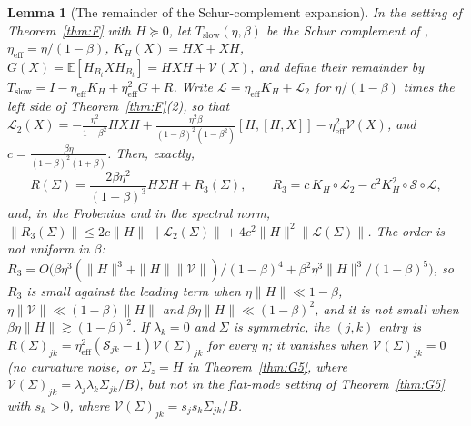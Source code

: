 \documentclass[11pt]{article}
\newtheorem{lemma}[theorem]{Lemma}
\theoremstyle{remark}
\newcommand{\E}{\mathbb{E}}
\begin{document}
\begin{lemma}[The remainder of the Schur-complement expansion]\label{lem:remainder}
In the setting of Theorem~\ref{thm:F} with $H\succeq0$, let $T_{\mathrm{slow}}(\eta,\beta)$ be the Schur complement of \citet[Appendix~D]{andreyev2026momentum}, $\eta_{\mathrm{eff}}=\eta/(1-\beta)$, $K_H(X)=HX+XH$, $G(X)=\E[H_{B_t}XH_{B_t}]=HXH+\mathcal V(X)$, and define their remainder by $T_{\mathrm{slow}}=I-\eta_{\mathrm{eff}}K_H+\eta_{\mathrm{eff}}^2G+R$. Write $\mathcal L=\eta_{\mathrm{eff}}K_H+\mathcal L_2$ for $\eta/(1-\beta)$ times the left side of Theorem~\ref{thm:F}(2), so that $\mathcal L_2(X)=-\frac{\eta^2}{1-\beta^2}HXH+\frac{\eta^2\beta}{(1-\beta)^2(1-\beta^2)}[H,[H,X]]-\eta_{\mathrm{eff}}^2\mathcal V(X)$, and $c=\frac{\beta\eta}{(1-\beta)^2(1+\beta)}$. Then, exactly,
\[
R(\Sigma)=\frac{2\beta\eta^2}{(1-\beta)^3}H\Sigma H+R_3(\Sigma),\qquad R_3=c\,K_H\circ\mathcal L_2-c^2K_H^2\circ\mathcal S\circ\mathcal L,
\]
and, in the Frobenius and in the spectral norm, $\|R_3(\Sigma)\|\le2c\|H\|\,\|\mathcal L_2(\Sigma)\|+4c^2\|H\|^2\|\mathcal L(\Sigma)\|$. The order is not uniform in $\beta$: $R_3=O\big(\beta\eta^3(\|H\|^3+\|H\|\|\mathcal V\|)/(1-\beta)^4+\beta^2\eta^3\|H\|^3/(1-\beta)^5\big)$, so $R_3$ is small against the leading term when $\eta\|H\|\ll1-\beta$, $\eta\|\mathcal V\|\ll(1-\beta)\|H\|$ and $\beta\eta\|H\|\ll(1-\beta)^2$, and it is not small when $\beta\eta\|H\|\gtrsim(1-\beta)^2$. If $\lambda_k=0$ and $\Sigma$ is symmetric, the $(j,k)$ entry is $R(\Sigma)_{jk}=\eta_{\mathrm{eff}}^2(\mathcal S_{jk}-1)\mathcal V(\Sigma)_{jk}$ for every $\eta$; it vanishes when $\mathcal V(\Sigma)_{jk}=0$ (no curvature noise, or $\Sigma_z=H$ in Theorem~\ref{thm:G5}, where $\mathcal V(\Sigma)_{jk}=\lambda_j\lambda_k\Sigma_{jk}/B$), but not in the flat-mode setting of Theorem~\ref{thm:G5} with $s_k>0$, where $\mathcal V(\Sigma)_{jk}=s_js_k\Sigma_{jk}/B$.
\end{lemma}
\end{document}
